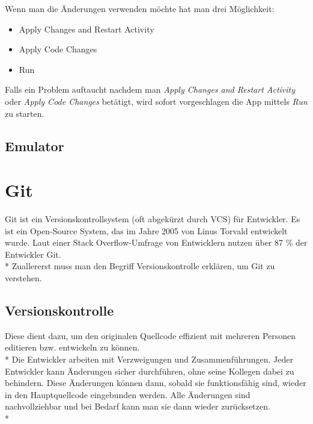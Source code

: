 Wenn man die Änderungen verwenden möchte hat man drei Möglichkeit:
\begin{itemize}
    \item Apply Changes and Restart Activity
    \item Apply Code Changes 
    \item Run 
\end{itemize}

Falls ein Problem auftaucht nachdem man \textit{Apply Changes and Restart Activity} oder \textit{Apply Code Changes} betätigt,
wird sofort vorgeschlagen die App mittels \textit{Run} zu starten. 

\subsection{Emulator}




\section{Git}
\author{Benjamin Besic}
Git ist ein Versionskontrollsystem (oft abgekürzt durch VCS) für Entwickler. Es ist ein Open-Source System, das im Jahre 2005
von Linus Torvald entwickelt wurde. Laut einer Stack Overflow-Umfrage von Entwicklern nutzen über 87 \% der Entwickler Git.
\cite{GitKinsta}
\\* Zuallererst muss man den Begriff Versionskontrolle erklären, um Git zu verstehen.
\subsection{Versionskontrolle}
Diese dient dazu, um den originalen Quellcode effizient mit mehreren Personen editieren bzw. entwickeln zu können. 
\\* Die Entwickler arbeiten mit Verzweigungen und Zusammenführungen. Jeder Entwickler kann Änderungen sicher durchführen, ohne seine Kollegen dabei 
zu behindern. Diese Änderungen können dann, sobald sie funktionsfähig sind, wieder in den Hauptquellcode eingebunden werden.
Alle Änderungen sind nachvollziehbar und bei Bedarf kann man sie dann wieder zurücksetzen.
\cite{GitKinsta} \\*

